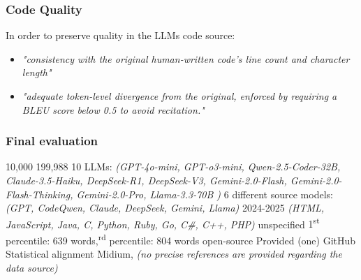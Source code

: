 \subsubsection*{Code Quality}
In order to preserve quality in the LLMs code source:
\begin{itemize}
    \item \textit{"consistency with the original human-written code's line count and character length"}
    \item \textit{"adequate token-level divergence from the original, enforced by requiring a 
    BLEU \cite{papineni2002bleu} score below 0.5 to avoid recitation."} 
\end{itemize}








\subsubsection*{Final evaluation}


\expandafter\def\csname CodeMirageHumanCode\endcsname{10,000}
\expandafter\def\csname CodeMirageLLMCode\endcsname{199,988}
\expandafter\def\csname CodeMirageNumLLMs\endcsname{10 LLMs: \textit{(GPT-4o-mini, GPT-o3-mini, Qwen-2.5-Coder-32B, Claude-3.5-Haiku, DeepSeek-R1, DeepSeek-V3,  Gemini-2.0-Flash,  Gemini-2.0-Flash-Thinking, Gemini-2.0-Pro, Llama-3.3-70B )}}
\expandafter\def\csname CodeMirageLLMDiversity\endcsname{6 different source models: \textit{(GPT, CodeQwen, Claude, DeepSeek, Gemini, Llama) }}
\expandafter\def\csname CodeMirageCurrentUse\endcsname{2024-2025}
\expandafter\def\csname CodeMirageLanguages\endcsname{\textit{(HTML, JavaScript, Java, C, Python, Ruby, Go, C\#, C++, PHP)}}
\expandafter\def\csname CodeMirageCodeTypes\endcsname{unspecified}
\expandafter\def\csname CodeMirageCodeSize\endcsname{1\textsuperscript{st} percentile: 639 words,\textsuperscript{rd} percentile: 804  words}
\expandafter\def\csname CodeMirageCodeContext\endcsname{open-source}
\expandafter\def\csname CodeMiragePrompts\endcsname{Provided (one)}
\expandafter\def\csname CodeMirageSources\endcsname{GitHub}
\expandafter\def\csname CodeMirageCodeQuality\endcsname{Statistical alignment}
\expandafter\def\csname CodeMirageReliability\endcsname{Midium, \textit{(no precise references are provided regarding the data source)}}



